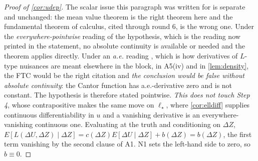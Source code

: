 \begin{proof}[Proof of \cref{cor:udep}]
The scalar issue this paragraph was written for is separate and unchanged: the mean value theorem is
the right theorem here and
the fundamental theorem of calculus, cited through round 6, is the wrong one. Under the
\emph{everywhere-pointwise} reading of the hypothesis, which is the reading now printed in the statement,
no absolute continuity is available or needed and the theorem applies directly. Under an \emph{a.e.} reading
, which is how derivatives of $L$-type nuisances are meant elsewhere in the block, in A5(iv) and in
\cref{lem:density}, the FTC would be the right citation and \emph{the conclusion would be false
without absolute continuity}: the Cantor function has a.e.-derivative zero and is not constant. The
hypothesis is therefore stated pointwise. \emph{This does not touch Step 4}, whose contrapositive makes
the same move on $\ell_\star$, where \cref{cor:elldiff} supplies continuous differentiability in $u$ and
a vanishing derivative is an everywhere-vanishing continuous one.
Evaluating at the truth and conditioning on $\Delta Z$,
$E[L(\Delta U,\Delta Z)\mid\Delta Z]=c(\Delta Z)E[\Delta U\mid\Delta Z]+b(\Delta Z)=b(\Delta Z)$, the
first term vanishing by the second clause of A1. N1 sets the left-hand side to zero, so $b\equiv0$.


\end{proof}
